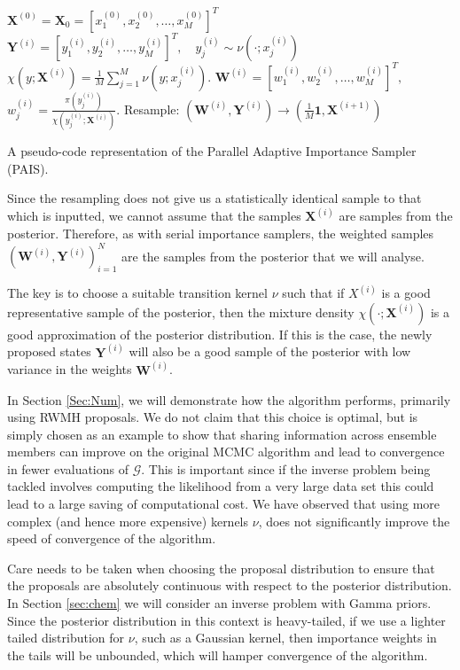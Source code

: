 \documentclass[final]{siamltex}
\newcommand{\G}{\mathcal{G}}
\newcommand{\X}{{\mathbf X}}
\newcommand{\Y}{{\mathbf Y}}
\newcommand{\W}{{\mathbf W}}
\begin{document}
\begin{table}
\begin{mdframed}
\begin{algorithmic}
\STATE $\X^{(0)} = \X_0 = [x_1^{(0)},x_2^{(0)},\ldots,x_M^{(0)}]^T$
\STATE $\Y^{(i)} = [y_1^{(i)},y_2^{(i)},\ldots,y_M^{(i)}]^T, \quad y_j^{(i)} \sim
\nu(\cdot;x_j^{(i)})$
\STATE $\chi(y;\X^{(i)}) = \frac{1}{M}
\sum_{j=1}^M \nu(y;x_j^{(i)})$.
\STATE $\W^{(i)} = [w_1^{(i)},w_2^{(i)},\ldots,w_M^{(i)}]^T,$ \quad $w^{(i)}_j =
\frac{\pi(y_j^{(i)})}{\chi(y_j^{(i)};\X^{(i)})}$.
\STATE Resample: $(\W^{(i)},\Y^{(i)}) \rightarrow (\frac{1}{M}\mathbf{1}, \X^{(i+1)})$
\ENDFOR 
\end{algorithmic}
\end{mdframed}

\caption{A pseudo-code representation of the Parallel Adaptive
  Importance Sampler (PAIS).}
\label{tab:PAIS}
\end{table}

Since the resampling does not give us a statistically identical sample
to that which is inputted, we cannot assume that the samples $\X^{(i)}$
are samples from the posterior. Therefore, as with serial
importance samplers, the weighted samples
$(\W^{(i)},\Y^{(i)})_{i=1}^N$ are the samples from the posterior that
we will analyse.

The key is to choose a suitable transition kernel $\nu$ such that
if $X^{(i)}$ is a good representative sample of the posterior,
then the mixture density $\chi(\cdot;\X^{(i)})$ is a good
approximation of the posterior distribution. If this is the case,
the newly proposed states $\Y^{(i)}$ will also be a good sample of the posterior with low variance in the
weights $\W^{(i)}$.

In Section \ref{Sec:Num}, we will demonstrate how the algorithm
performs, primarily using RWMH proposals. We do not claim that this choice is optimal, but
is simply chosen as an example to show that sharing information across
ensemble members can improve on the original MCMC algorithm and lead to
convergence in fewer evaluations of $\G$. This is important since if
the inverse problem being tackled involves computing
the likelihood from a very large data set this could lead to a
large saving of computational cost. We have observed that
using more complex (and hence more expensive) kernels $\nu$, does not
significantly improve the speed of convergence of the algorithm.

Care needs to be taken when choosing the proposal distribution to
ensure that the proposals are absolutely continuous with respect to
the posterior distribution. In Section \ref{sec:chem} we will consider
an inverse problem with Gamma priors. Since the posterior distribution
in this context is heavy-tailed, if we use a lighter tailed
distribution for $\nu$, such as a Gaussian kernel, then importance
weights in the tails will be unbounded, which will hamper convergence
of the algorithm.
\end{document}
